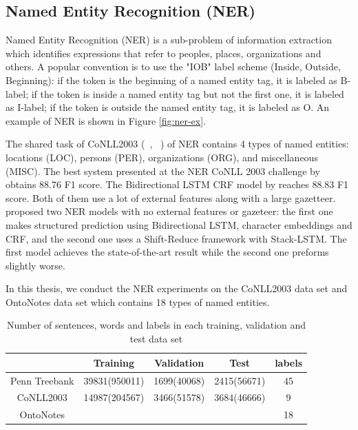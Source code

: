 \documentclass{sfuthesis}
\begin{document}
\subsection{Named Entity Recognition (NER)}

Named Entity Recognition (NER) is a sub-problem of
information extraction which identifies expressions
that refer to peoples, places, organizations and others. A popular convention is to use the "IOB" label scheme (Inside, Outside, Beginning): if the token is the beginning of a named entity tag, it is labeled as B-label; if the token is inside a named entity tag but not the first one, it is labeled as I-label; if the token is outside the named entity tag, it is labeled as O. An example of NER is shown in Figure \ref{fig:ner-ex}.

The shared task of CoNLL2003 (~\citeauthor{tjong2003introduction}, ~\citeyear{tjong2003introduction}) of NER contains 4 types of named entities: locations (LOC), persons (PER), organizations (ORG), and miscellaneous (MISC).
The best system presented at the NER CoNLL 2003 challenge by \cite{florian2003named} obtains 88.76 F1 score. The Bidirectional LSTM CRF model by \cite{huang2015bidirectional} reaches 88.83 F1 score. Both of them use a lot of external features along with a large gazetteer. \cite{lample2016neural} proposed two NER models with no external features or gazeteer: the first one makes structured prediction using Bidirectional LSTM, character embeddings and CRF, and the second one uses a Shift-Reduce framework with Stack-LSTM. The first model achieves the state-of-the-art result while the second one preforms slightly worse. 


In this thesis, we conduct the NER experiments on the CoNLL2003 data set and OntoNotes data set which contains 18 types of named entities. 



\begin{table}[]
\centering
\caption{Number of sentences, words and labels in each training, validation and test data set}
\label{table:my-dataset}
\begin{tabular}{|c|c|c|c|c|} \hline
      & Training  & Validation  & Test  & labels  \\ \hline
Penn Treebank   &39831(950011) &1699(40068) &2415(56671) &45\\\hline
CoNLL2003   &14987(204567) &3466(51578) &3684(46666) &9     \\\hline
OntoNotes   & & & &18     \\\hline
\end{tabular}
\end{table}
\end{document}
